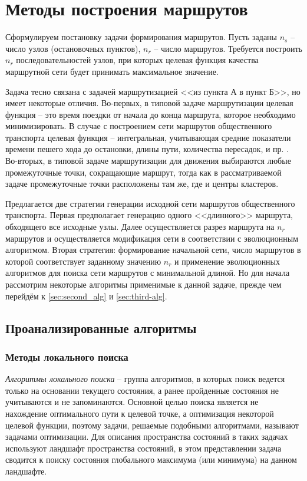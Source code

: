\chapter{Методы построения маршрутов}\label{chp:methods}
Сформулируем постановку задачи формирования маршрутов. Пусть заданы \( n_s \) -- число узлов (остановочных 
пунктов), \( n_r \) -- число маршрутов. Требуется построить \( n_r \) последовательностей узлов, при которых 
целевая функция качества маршрутной сети будет принимать максимальное значение. 

Задача тесно связана с задачей маршрутизацией <<из пункта А в пункт Б>>, но имеет некоторые отличия. 
Во-первых, в типовой задаче маршрутизации целевая функция -- это время поездки от начала до конца маршрута, 
которое необходимо минимизировать. В случае с построением сети маршрутов общественного транспорта целевая 
функция -- интегральная, учитывающая средние показатели времени пешего хода до остановки, длины пути, 
количества пересадок, и пр. \cite{bib:9,bib:17}. Во-вторых, в типовой задаче маршрутизации для движения 
выбираются любые промежуточные точки, сокращающие маршрут, тогда как в рассматриваемой задаче промежуточные 
точки расположены там же, где и центры кластеров.

Предлагается две стратегии генерации исходной сети маршрутов общественного транспорта. Первая предполагает 
генерацию одного <<длинного>> маршрута, обходящего все исходные узлы. Далее осуществляется разрез маршрута 
на \( n_r \) маршрутов и осуществляется модификация сети в соответствии с эволюционным алгоритмом. Вторая 
стратегия: формирование начальной сети, число маршрутов в которой соответствует заданному значению \( n_r \) 
и применение эволюционных алгоритмов для поиска сети маршрутов с минимальной длиной. Но для начала рассмотрим 
некоторые алгоритмы применимые к данной задаче, прежде чем перейдём к \ref{sec:second_alg} и 
\ref{sec:third-alg}.

\section{Проанализированные алгоритмы}
\subsection{Методы локального поиска}
\emph{Алгоритмы локального поиска} -- группа алгоритмов, в которых поиск ведется только на основании текущего 
состояния, а ранее пройденные состояния не учитываются и не запоминаются. Основной целью поиска является не 
нахождение оптимального пути к целевой точке, а оптимизация некоторой целевой функции, поэтому задачи, 
решаемые подобными алгоритмами, называют задачами оптимизации. Для описания пространства состояний в таких 
задачах используют ландшафт пространства состояний, в этом представлении задача сводится к поиску состояния 
глобального максимума (или минимума) на данном ландшафте.

